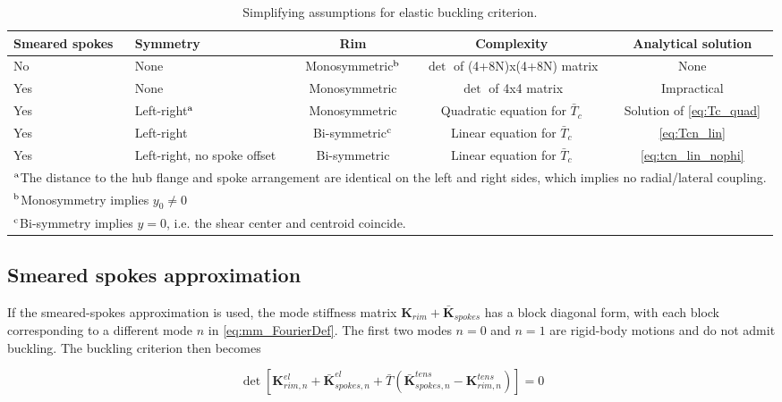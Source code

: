 \documentclass[\rootdir/thesis.tex]{subfiles}
\begin{document}
\begin{table}[h]
\caption{Simplifying assumptions for elastic buckling criterion.}
\label{tab:BucklingSolutions}
\begin{tabularx}{\textwidth}{p{1.2cm}Xccc}
\toprule
\centering Smeared spokes & \centering Symmetry & Rim & Complexity & Analytical solution\\
\midrule
\centering No  & \centering None & Monosymmetric$^{\rm b}$ & $\det$ of (4+8N)x(4+8N) matrix & None\\
\centering Yes & \centering None & Monosymmetric & $\det$ of 4x4 matrix & Impractical\\
\centering Yes & \centering Left-right$^{\rm a}$& Monosymmetric& Quadratic equation for $\bar{T}_c$ & Solution of \eqref{eq:Tc_quad}\\
\centering Yes & \centering Left-right& Bi-symmetric$^{\rm c}$ & Linear equation for $\bar{T}_c$ & \eqref{eq:Tcn_lin}\\
\centering Yes & \centering Left-right, no spoke offset & Bi-symmetric & Linear equation for $\bar{T}_c$ & \eqref{eq:tcn_lin_nophi}\\
\bottomrule
\multicolumn{5}{p{\textwidth}}{
$^{\rm a}$The distance to the hub flange and spoke arrangement are identical on the left and right sides, which implies no radial/lateral coupling.
}\\
\multicolumn{5}{p{\textwidth}}{
$^{\rm b}$Monosymmetry implies $y_0\neq 0$
}\\
\multicolumn{5}{p{\textwidth}}{
$^{\rm c}$Bi-symmetry implies $y=0$, i.e. the shear center and centroid coincide.
}\\
\bottomrule
\end{tabularx}
\end{table}

\subsection{Smeared spokes approximation}

If the smeared-spokes approximation is used, the mode stiffness matrix $\mathbf{K}_{rim} + \mathbf{\bar{K}}_{spokes}$ has a block diagonal form, with each block corresponding to a different mode $n$ in \eqref{eq:mm_FourierDef}. The first two modes $n=0$ and $n=1$ are rigid-body motions and do not admit buckling. The buckling criterion then becomes

\begin{equation}
\label{eq:Tc_crit_smeared}
\det{\left[\mathbf{K}_{rim,n}^{el} + \mathbf{\bar{K}}_{spokes,n}^{el} + \bar{T}(\mathbf{\bar{K}}_{spokes,n}^{tens} - \mathbf{K}_{rim,n}^{tens})\right]} = 0
\end{equation}
\end{document}
